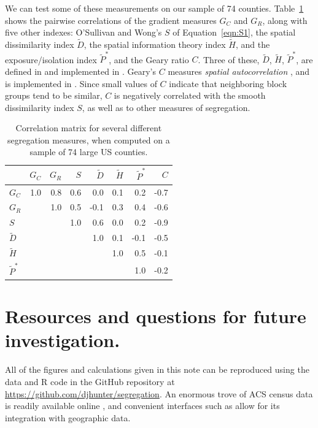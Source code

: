 \documentclass{article}
\theoremstyle{theorem}
\theoremstyle{definition}
\begin{document}
We can test some of these measurements on our sample of 74 counties. Table~\ref{tab:indexcor} shows the pairwise correlations of the gradient measures $G_C$ and $G_R$, along with five other indexes: O'Sullivan and Wong's $S$ of Equation~\ref{eqn:S1}, the spatial dissimilarity index $\tilde{D}$, the spatial information theory index $\tilde{H}$, and the exposure/isolation index $\tilde{P}^*$, and the Geary ratio $C$. Three of these, $\tilde{D}$, $\tilde{H}$, $\tilde{P}^*$, are defined in \cite{reardonosullivan04} and implemented in \cite{hong14}. Geary's $C$ measures \textit{spatial autocorrelation} \cite{clifford81}, and is implemented in \cite{bivand19}. Since small values of $C$ indicate that neighboring block groups tend to be similar, $C$ is negatively correlated with the smooth dissimilarity index $S$, as well as to other measures of segregation.

\begin{table}[bh]
\centering
\begin{tabular}{l|rrrrrrr} %
   & $G_C$ & $G_R$ & $S$ & $\tilde{D}$ &  $\tilde{H}$ & $\tilde{P}^*$ & $C$ \\
  \hline
  $G_C$ & 1.0 & 0.8 & 0.6 & 0.0 & 0.1 & 0.2 & -0.7 \\
  $G_R$ &  & 1.0 & 0.5 & -0.1 & 0.3 & 0.4 & -0.6 \\
  $S$ &  &  & 1.0 & 0.6 & 0.0 & 0.2 & -0.9 \\
  $\tilde{D}$ &  &  &  & 1.0 & 0.1 & -0.1 & -0.5 \\
  $\tilde{H}$ &  &  &  &  & 1.0 & 0.5 & -0.1\\
  $\tilde{P}^*$ &  &  &  &  &  & 1.0 & -0.2  \\
\end{tabular}
\caption{Correlation matrix for several different segregation measures, when computed on a sample of 74 large US counties.}
\label{tab:indexcor}
\end{table}


\section{Resources and questions for future investigation.}

All of the figures and calculations given in this note can be reproduced using the data and R code in the GitHub repository at \href{https://github.com/djhunter/segregation}{\url{https://github.com/djhunter/segregation}}. An enormous trove of ACS census data is readily available online \cite{acs19}, and convenient interfaces such as \cite{walker19} allow for its integration with geographic data.
\end{document}
